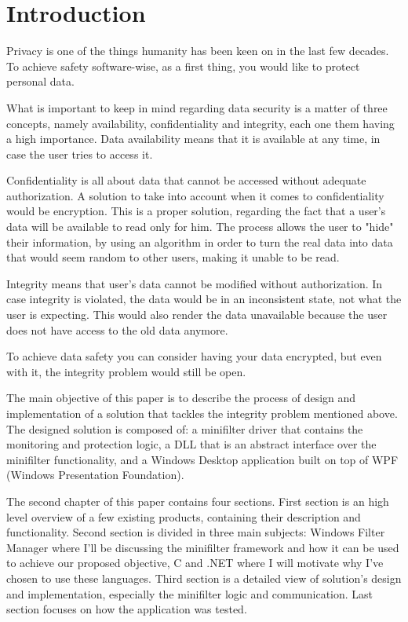 \chapter{Introduction}
	Privacy is one of the things humanity has been keen on in the last few decades. To achieve safety software-wise, as a first thing, you would like to protect personal data. 
	
	What is important to keep in mind regarding data security is a matter of three concepts, namely availability, confidentiality and integrity, each one them having a high importance. Data availability means that it is available at any time, in case the user tries to access it.
	
	Confidentiality is all about data that cannot be accessed without adequate authorization. A solution to take into account when it comes to confidentiality would be encryption. This is a proper solution, regarding the fact that a user's data will be available to read only for him. The process allows the user to "hide" their information, by using an algorithm in order to turn the real data into data that would seem random to other users, making it unable to be read.
	
	Integrity means that user's data cannot be modified without authorization. In case integrity is violated, the data would be in an inconsistent state, not what the user is expecting. This would also render the data unavailable because the user does not have access to the old data anymore.
	
	To achieve data safety you can consider having your data encrypted, but even with it, the integrity problem would still be open.   
	
	The main objective of this paper is to describe the process of design and implementation of a solution that tackles the integrity problem mentioned above. The designed solution is composed of: a minifilter driver that contains the monitoring and protection logic, a DLL that is an abstract interface over the minifilter functionality, and a Windows Desktop application built on top of WPF (Windows Presentation Foundation). 
	
	The second chapter of this paper contains four sections. First section is an high level overview of a few existing products, containing their description and functionality. Second section is divided in three main subjects: Windows Filter Manager where I'll be discussing the minifilter framework and how it can be used to achieve our proposed objective, C and .NET where I will motivate why I've chosen to use these languages. Third section is a detailed view of solution's design and implementation, especially the minifilter logic and communication. Last section focuses on how the application was tested.
	
